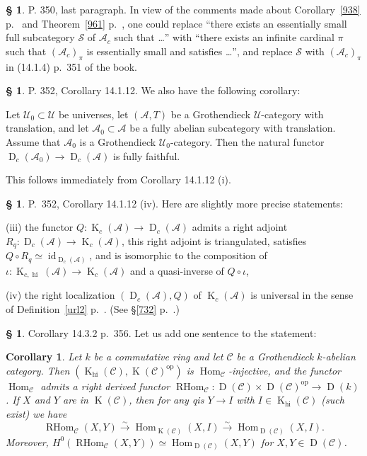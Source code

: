 \documentclass[12pt]{article}%
\newtheorem{cor}[thm]{Corollary}
\theoremstyle{remark}
\theoremstyle{definition}
\newtheorem{s}[thm]{\S}%
\newcommand{\cc}{\mathcal}
\newcommand{\oo}{\operatorname}
\newcommand{\A}{\mathcal A}
\newcommand{\C}{\mathcal C}
\newcommand{\U}{\mathcal U}
\newcommand{\xr}{\xrightarrow}
\DeclareMathOperator{\D}{D}
\DeclareMathOperator{\id}{id}
\DeclareMathOperator{\Hom}{Hom}%
\DeclareMathOperator{\op}{op}
\begin{document}
%

\begin{s} 
P. 350, last paragraph. In view of the comments made about Corollary~\ref{938} p.~\pageref{938} and Theorem~\ref{961} p.~\pageref{961}, one could replace ``there exists an essentially small full subcategory $\cc S$ of $\A_c$ such that \dots'' with ``there exists an infinite cardinal $\pi$ such that $(\A_c)_\pi$ is essentially small and satisfies \dots'', and replace $\cc S$ with $(\A_c)_\pi$ in (14.1.4) p.~351 of the book.
\end{s}

%

\begin{s}\label{14112}
P. 352, Corollary 14.1.12. We also have the following corollary: %

Let $\U_0\subset\U$ be universes, let $(\A,T)$ be a Grothendieck $\U$-category with translation, and let $\A_0\subset\A$ be a fully abelian subcategory with translation. Assume that $\A_0$ is a Grothendieck $\U_0$-category. Then the natural functor $\D_c(\A_0)\to\D_c(\A)$ is fully faithful.

This follows immediately from Corollary 14.1.12 (i). 
\end{s}

%

\begin{s} 
P.~352, Corollary 14.1.12 (iv). Here are slightly more precise statements:

\noindent(iii) the functor $Q:\oo K_c(\A)\to\oo D_c(\A)$ admits a right adjoint $R_q:\oo D_c(\A)\to\oo K_c(\A)$, this right adjoint is triangulated, satisfies $Q\circ R_q\simeq\id_{\oo D_c(\A)}$, and is isomorphic to the composition of $\iota:\oo K_{c,\oo{hi}}(\A)\to\oo K_c(\A)$ and a quasi-inverse of $Q\circ\iota$,

\noindent(iv) the right localization $(\oo D_c(\A),Q)$ of $\oo K_c(\A)$ is universal in the sense of Definition~\ref{url2} p.~\pageref{url2}. (See \S\ref{732} p.~\pageref{732}.)
\end{s}

%

\begin{s}%
Corollary 14.3.2 p.~356. Let us add one sentence to the statement:
%
\begin{cor}\label{1432}
Let $k$ be a commutative ring and let $\C$ be a Grothendieck $k$-abelian category. Then $(\oo K_{\oo{hi}}(\C),\oo K(\C)^{\op})$ is $\Hom_\C$-injective, and the functor $\Hom_\C$ admits a right derived functor $\oo{RHom}_\C:\oo D(\C)\times\oo D(\C)^{\op}\to\oo D(k)$. If $X$ and $Y$ are in $\oo K(\C)$, then for any qis $Y\to I$ with $I\in\oo K_{\oo{hi}}(\C)$ (such exist) we have 
$$
\oo{RHom}_\C(X,Y)\xr\sim\Hom_{\oo K(\C)}(X,I)\xr\sim\Hom_{\oo D(\C)}(X,I).
$$ 
Moreover, $H^0(\oo{RHom}_\C(X,Y))\simeq\Hom_{\oo D(\C)}(X,Y)$ for $X,Y\in\oo D(\C)$.
\end{cor}
\end{s}
\end{document}
